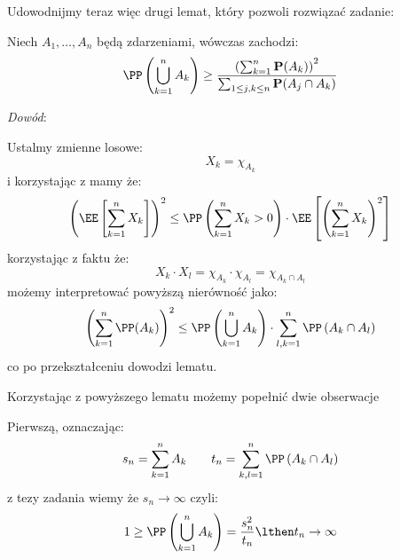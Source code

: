 \documentclass[11pt]{scrartcl}
\begin{document}
    Udowodnijmy teraz więc drugi lemat, który pozwoli rozwiązać zadanie:
    \begin{lemat}
        \label{lem:nier}
        Niech $A_1, \dots, A_n$ będą zdarzeniami, wówczas zachodzi:
        \[
            \PP \left ( \bigcup_{k = 1}^n A_k \right ) \geq 
                \frac{\left( \sum_{k=1}^{n} \mathbf{P}(A_k) \right)^2}
                {\sum_{1 \leq j, k \leq n} \mathbf{P}(A_j \cap A_k)} 
        \]
    \end{lemat}
    
    \textit{Dowód}:

    Ustalmy zmienne losowe:
    \[
        X_k = \chi_{A_k}
    \]
    i korzystając z  mamy że:
    \[
        \left ( \EE \left [ \sum_{k = 1}^{n} X_k \right ] \right )^2 \leq 
        \PP \left ( \sum_{k=1}^{n} X_k > 0 \right ) \cdot 
        \EE \left [ \left ( \sum_{k=1}^{n} X_k \right )^2 \right ]
    \]
    korzystając z faktu że:
    \[
        X_k \cdot X_l = \chi_{A_k} \cdot \chi_{A_l} = \chi_{A_k \cap A_l}
    \]
    możemy interpretować powyższą nierówność jako:
    \[
        \left ( \sum_{k=1}^{n} \PP (A_k) \right )^2 \leq 
        \PP \left (\bigcup_{k=1}^{n} A_k \right ) \cdot 
        \sum_{l,k = 1}^{n} \PP \left ( A_k \cap A_l \right )  
    \]
    co po przekształceniu dowodzi lematu.

    Korzystając z powyższego lematu możemy popełnić dwie obserwacje 

    Pierwszą, oznaczając:
    \begin{gather*}
        s_n = \sum_{k=1}^{n} A_k \qquad  
        t_n = \sum_{k,l = 1}^{n} \PP \left ( A_k \cap A_l \right )
    \end{gather*}
    z tezy zadania wiemy że $s_n \to \infty $ czyli:
    \[
        1 \geq \PP \left ( \bigcup_{k=1}^{n} A_k \right ) = 
        \frac{s_n^2}{t_n} \lthen t_n \to \infty 
    \]
\end{document}
